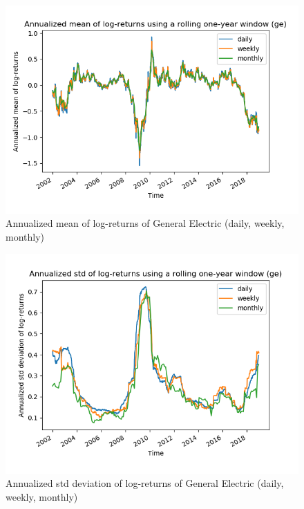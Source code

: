 \documentclass[10pt]{article}
\newenvironment{exercise}[2][Exercise]{\begin{trivlist}
  \item[\hskip \labelsep {\bfseries #1}\hskip \labelsep {\bfseries #2.}]}{\end{trivlist}}
\begin{document}
\begin{exercise}{4}
\begin{figure}[H]
		\centering
		\includegraphics[scale=0.5]{Figures/problem4d_mean_ge.png}	
		\caption{Annualized mean of log-returns of General Electric (daily, weekly, monthly)}	
		\label{fig:problem3d_men_ge}
	
	\end{figure}
	
	\begin{figure}[H]
	
		\centering
		\includegraphics[scale=0.5]{Figures/problem4d_std_ge.png}	
		\caption{Annualized std deviation of log-returns of General Electric (daily, weekly, monthly)}	
		\label{fig:problem3d_std_ge}
	
	\end{figure} 
 
  \end{exercise} 


\end{document}
